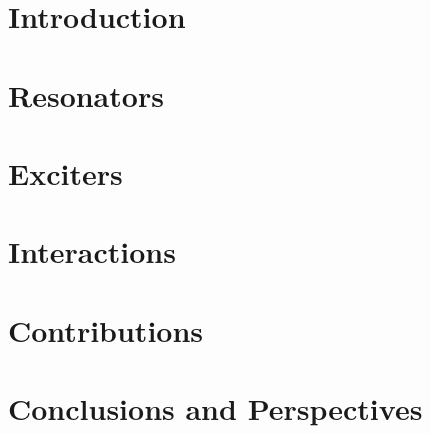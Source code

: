 \cleardoublepage
{}
\pagestyle{fancy} %
\tableofcontents

\cleardoublepage

\def\makeAlph[#1]{\symbol{\numexpr96+#1}}

\mainmatter

\part{Introduction}\label{part:introduction}


\part{Resonators}\label{part:resonators}


\part{Exciters}\label{part:exciters}


\part{Interactions}\label{part:interactions}


% 

\part{Contributions}\label{part:contributions}



\part{Conclusions and Perspectives}\label{part:conclusion}



